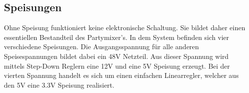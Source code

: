 \subsection{Speisungen}
\label{subsec:Speisungen}

Ohne Speisung funktioniert keine elektronische Schaltung. Sie bildet daher einen essentiellen Bestandteil des Partymixer's. In dem System befinden sich vier verschiedene Speisungen. Die Ausgangsspannung für alle anderen Speisespannungen bildet dabei ein 48V Netzteil. Aus dieser Spannung wird mittels Step-Down Reglern eine 12V und eine 5V Speisung erzeugt. Bei der vierten Spannung handelt es sich um einen einfachen Linearregler, welcher aus den 5V eine 3.3V Speisung realisiert. 